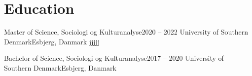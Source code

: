 \section{Education}
\mySubHeadingListStart

  \mySubHeading
    {Master of Science, Sociologi og Kulturanalyse}{2020 -- 2022}
    {University of Southern Denmark}{Esbjerg, Danmark}
    \myItemListStart
      jjjjj
    \myItemListEnd

  \mySubHeading
    {Bachelor of Science, Sociologi og Kulturanalyse}{2017 -- 2020}
    {University of Southern Denmark}{Esbjerg, Danmark}
    \myItemListStart
    \myItemListEnd

\mySubHeadingListEnd
